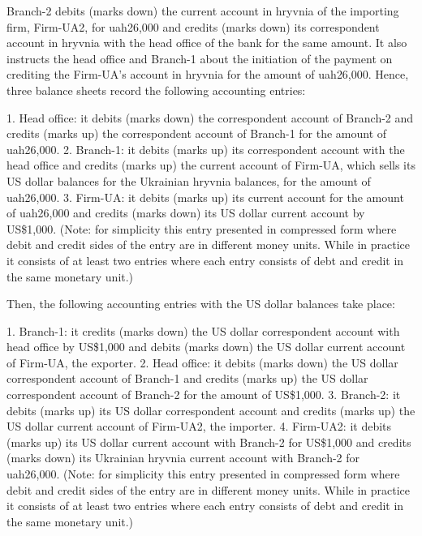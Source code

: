 Branch-2 debits (marks down) the current account in hryvnia of the importing firm, Firm-UA2, for \ac{uah}26,000 and credits (marks down) its correspondent account in hryvnia with the head office of the bank for the same amount. It also instructs the head office and Branch-1 about the initiation of the payment on crediting the Firm-UA's account in hryvnia for the amount of \ac{uah}26,000. Hence, three balance sheets record the following accounting entries: \par

1. Head office: it debits (marks down) the correspondent account of Branch-2 and credits (marks up) the correspondent account of Branch-1 for the amount of \ac{uah}26,000.
2. Branch-1: it debits (marks up) its correspondent account with the head office and credits (marks up) the current account of Firm-UA, which sells its US dollar balances for the Ukrainian hryvnia balances, for the amount of \ac{uah}26,000.
3. Firm-UA: it debits (marks up) its current account for the amount of \ac{uah}26,000 and credits (marks down) its US dollar current account by US\$1,000. (Note: for simplicity this entry presented in compressed form where debit and credit sides of the entry are in different money units. While in practice it consists of at least two entries where each entry consists of debt and credit in the same monetary unit.) \par

Then, the following accounting entries with the US dollar balances take place: \par

1. Branch-1: it credits (marks down) the US dollar correspondent account with head office by US\$1,000 and debits (marks down) the US dollar current account of Firm-UA, the exporter.
2. Head office: it debits (marks down) the US dollar correspondent account of Branch-1 and credits (marks up) the US dollar correspondent account of Branch-2 for the amount of US\$1,000.
3. Branch-2: it debits (marks up) its US dollar correspondent account and credits (marks up) the US dollar current account of Firm-UA2, the importer.
4. Firm-UA2: it debits (marks up) its US dollar current account with Branch-2 for US\$1,000 and credits (marks down) its Ukrainian hryvnia current account with Branch-2 for \ac{uah}26,000. (Note: for simplicity this entry presented in compressed form where debit and credit sides of the entry are in different money units. While in practice it consists of at least two entries where each entry consists of debt and credit in the same monetary unit.) \par

